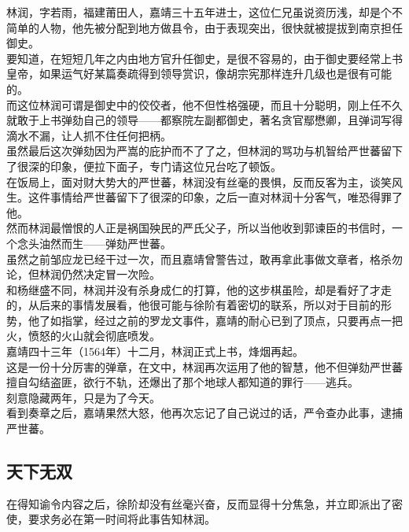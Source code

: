 \begin{multicols}{\theparacolNo}
林润，字若雨，福建莆田人，嘉靖三十五年进士，这位仁兄虽说资历浅，却是个不简单的人物，他先被分配到地方做县令，由于表现突出，很快就被提拔到南京担任御史。\\

要知道，在短短几年之内由地方官升任御史，是很不容易的，由于御史要经常上书皇帝，如果运气好某篇奏疏得到领导赏识，像胡宗宪那样连升几级也是很有可能的。\\

而这位林润可谓是御史中的佼佼者，他不但性格强硬，而且十分聪明，刚上任不久就敢于上书弹劾自己的领导——都察院左副都御史，著名贪官鄢懋卿，且弹词写得滴水不漏，让人抓不住任何把柄。\\

虽然最后这次弹劾因为严嵩的庇护而不了了之，但林润的骂功与机智给严世蕃留下了很深的印象，便拉下面子，专门请这位兄台吃了顿饭。\\

在饭局上，面对财大势大的严世蕃，林润没有丝毫的畏惧，反而反客为主，谈笑风生。这件事情给严世蕃留下了很深的印象，之后一直对林润十分客气，唯恐得罪了他。\\

然而林润最憎恨的人正是祸国殃民的严氏父子，所以当他收到郭谏臣的书信时，一个念头油然而生——弹劾严世蕃。\\

虽然之前邹应龙已经干过一次，而且嘉靖曾警告过，敢再拿此事做文章者，格杀勿论，但林润仍然决定冒一次险。\\

和杨继盛不同，林润并没有杀身成仁的打算，他的这步棋虽险，却是看好了才走的，从后来的事情发展看，他很可能与徐阶有着密切的联系，所以对于目前的形势，他了如指掌，经过之前的罗龙文事件，嘉靖的耐心已到了顶点，只要再点一把火，愤怒的火山就会彻底喷发。\\

嘉靖四十三年（1564年）十二月，林润正式上书，烽烟再起。\\

这是一份十分厉害的弹章，在文中，林润再次运用了他的智慧，他不但弹劾严世蕃擅自勾结盗匪，欲行不轨，还爆出了那个地球人都知道的罪行——逃兵。\\

刻意隐藏两年，只是为了今天。\\

看到奏章之后，嘉靖果然大怒，他再次忘记了自己说过的话，严令查办此事，逮捕严世蕃。\\

\subsection{天下无双}
在得知谕令内容之后，徐阶却没有丝毫兴奋，反而显得十分焦急，并立即派出了密使，要求务必在第一时间将此事告知林润。\\


\end{multicols}
